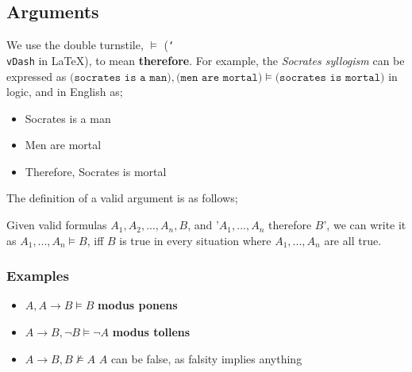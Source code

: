 \documentclass[a4paper, 12pt]{article}
\begin{document}
        \subsection*{Arguments}
            We use the double turnstile, $\vDash$ (\texttt{\char`\\vDash} in \LaTeX), to mean \textbf{therefore}. For example, the \textit{Socrates syllogism} can be expressed as $\texttt{(socrates is a man)}, \texttt{(men are mortal)} \vDash \texttt{(socrates is mortal)}$ in logic, and in English as;
            \begin{itemize}
                \itemsep0em
                \item Socrates is a man
                \item Men are mortal
                \item Therefore, Socrates is mortal
            \end{itemize}
            \medskip

            The definition of a valid argument is as follows;
            \smallskip

            Given valid formulas $A_1, A_2, ..., A_n, B$, and '$A_1, ..., A_n$ therefore $B$', we can write it as $A_1, ..., A_n \vDash B$, iff $B$ is true in every situation where $A_1, ..., A_n$ are all true.
            \subsubsection*{Examples}
                \begin{itemize}
                    \itemsep0em
                    \item $A, A \rightarrow B \vDash B$ \hfill \textbf{modus ponens}
                    \item $A \rightarrow B, \neg B \vDash \neg A$ \hfill \textbf{modus tollens}
                    \item $A \rightarrow B, B \nvDash A$ \hfill $A$ can be false, as falsity implies anything
                \end{itemize}
\end{document}
